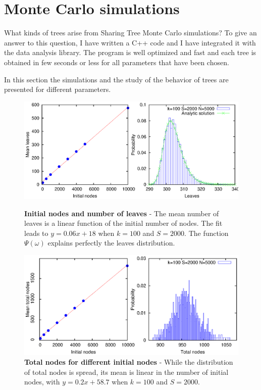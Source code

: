 \section{Monte Carlo simulations}
What kinds of trees arise from Sharing Tree Monte Carlo simulations? To give an answer to this question, I have written a C++ code and I have integrated it with the data analysis library. The program is well optimized and fast and each tree is obtained in few seconds or less for all parameters that have been chosen.

In this section the simulations and the study of the behavior of trees are presented for different parameters.

\begin{figure}[p]%
\includegraphics[width=\textwidth,draft=false]{grafici/Tnodes.eps}
\caption{\label{Tnodi} \footnotesize\textbf{Initial nodes and number of leaves} - The mean number of leaves is a linear function of the initial number of nodes. The fit leads to $y=0.06x + 18$ when $k=100$ and $S=2000$. The function $\Psi (\omega)$ explains perfectly the leaves distribution.}
\vspace{1cm}
\includegraphics[width=\textwidth,draft=false]{grafici/Ttotnodes.eps}
\caption{\label{Ttotnodes} \footnotesize\textbf{Total nodes for different initial nodes} - While the distribution of total nodes is spread, its mean is linear in the number of initial nodes, with $y=0.2x + 58.7$ when $k=100$ and $S=2000$.}
\end{figure}

